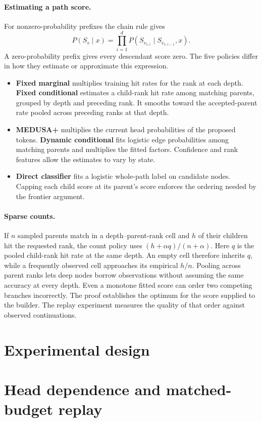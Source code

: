 \documentclass{article}
\begin{document}
\paragraph{Estimating a path score.} For nonzero-probability prefixes the chain rule gives
\[
P(S_v\mid x)=\prod_{i=1}^d P(S_{v_{1:i}}\mid S_{v_{1:i-1}},x).
\]
A zero-probability prefix gives every descendant score zero. The five policies differ in how they estimate or approximate this expression.
\begin{itemize}
\item \textbf{Fixed marginal} multiplies training hit rates for the rank at each depth. \textbf{Fixed conditional} estimates a child-rank hit rate among matching parents, grouped by depth and preceding rank. It smooths toward the accepted-parent rate pooled across preceding ranks at that depth.
\item \textbf{MEDUSA+} multiplies the current head probabilities of the proposed tokens. \textbf{Dynamic conditional} fits logistic edge probabilities among matching parents and multiplies the fitted factors. Confidence and rank features allow the estimates to vary by state.
\item \textbf{Direct classifier} fits a logistic whole-path label on candidate nodes. Capping each child score at its parent's score enforces the ordering needed by the frontier argument.
\end{itemize}
\paragraph{Sparse counts.} If $n$ sampled parents match in a depth--parent-rank cell and $h$ of their children hit the requested rank, the count policy uses $(h+\alpha q)/(n+\alpha)$. Here $q$ is the pooled child-rank hit rate at the same depth. An empty cell therefore inherits $q$, while a frequently observed cell approaches its empirical $h/n$. Pooling across parent ranks lets deep nodes borrow observations without assuming the same accuracy at every depth.
Even a monotone fitted score can order two competing branches incorrectly. The proof establishes the optimum for the score supplied to the builder. The replay experiment measures the quality of that order against observed continuations.
\clearpage
\section{Experimental design}

\clearpage
\section{Head dependence and matched-budget replay}

\clearpage
\end{document}
